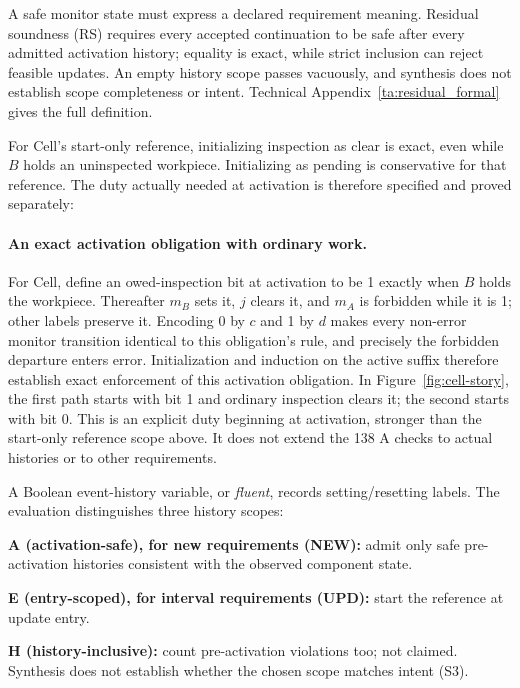 A safe monitor state must express a declared requirement meaning. Residual soundness (RS) requires every accepted continuation to be safe after every admitted activation history; equality is exact, while strict inclusion can reject feasible updates. An empty history scope passes vacuously, and synthesis does not establish scope completeness or intent. Technical Appendix~\ref{ta:residual_formal} gives the full definition.

For Cell's start-only reference, initializing inspection as clear is exact, even while $B$ holds an uninspected workpiece. Initializing as pending is conservative for that reference. The duty actually needed at activation is therefore specified and proved separately:

\paragraph{An exact activation obligation with ordinary work.}\label{sec:cell-activation-duty}
For Cell, define an owed-inspection bit at activation to be 1 exactly when $B$ holds the workpiece. Thereafter $m_B$ sets it, $j$ clears it, and $m_A$ is forbidden while it is 1; other labels preserve it. Encoding 0 by $c$ and 1 by $d$ makes every non-error monitor transition identical to this obligation's rule, and precisely the forbidden departure enters error. Initialization and induction on the active suffix therefore establish exact enforcement of this activation obligation. In Figure~\ref{fig:cell-story}, the first path starts with bit 1 and ordinary inspection clears it; the second starts with bit 0. This is an explicit duty beginning at activation, stronger than the start-only reference scope above. It does not extend the 138 A checks to actual histories or to other requirements.

A Boolean event-history variable, or \emph{fluent}, records setting/resetting labels. The evaluation distinguishes three history scopes:
\par\noindent\textbf{A (activation-safe), for new requirements (NEW):} admit only safe pre-activation histories consistent with the observed component state.
\par\noindent\textbf{E (entry-scoped), for interval requirements (UPD):} start the reference at update entry.
\par\noindent\textbf{H (history-inclusive):} count pre-activation violations too; not claimed. Synthesis does not establish whether the chosen scope matches intent (S3).
